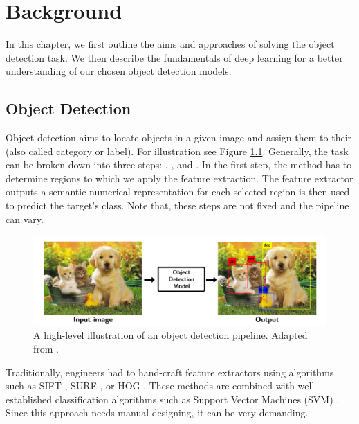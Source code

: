 \chapter{Background}
In this chapter, we first outline the aims and approaches of solving the object
detection task. We then describe the fundamentals of deep learning for a better
understanding of our chosen object detection models.

\section{Object Detection}

Object detection aims to locate objects in a given image and assign them to
their  (also called category or label). For illustration see Figure
\ref{fig:od}. Generally, the task can be broken down into three steps:
, , and
. In the first step, the method has to determine regions to
which we apply the feature extraction. The feature extractor outputs a semantic
numerical representation for each selected region is then used to predict the
target's class. Note that, these steps are not fixed and the pipeline can vary.

\begin{figure}[h]
    \centering
    \includegraphics[width=0.9\linewidth]{Sources/Figures/objectdetection.png}
    \caption{A high-level illustration of an object detection pipeline. Adapted
        from \cite{objectdetectionfigure}.}
    \label{fig:od}
\end{figure}

Traditionally, engineers had to hand-craft feature extractors using algorithms
such as SIFT \cite{sift}, SURF \cite{surf}, or HOG \cite{hog}. These methods are
combined with well-established classification algorithms such as Support Vector
Machines (SVM) \cite{svm}. Since this approach needs manual designing, it can be
very demanding.

